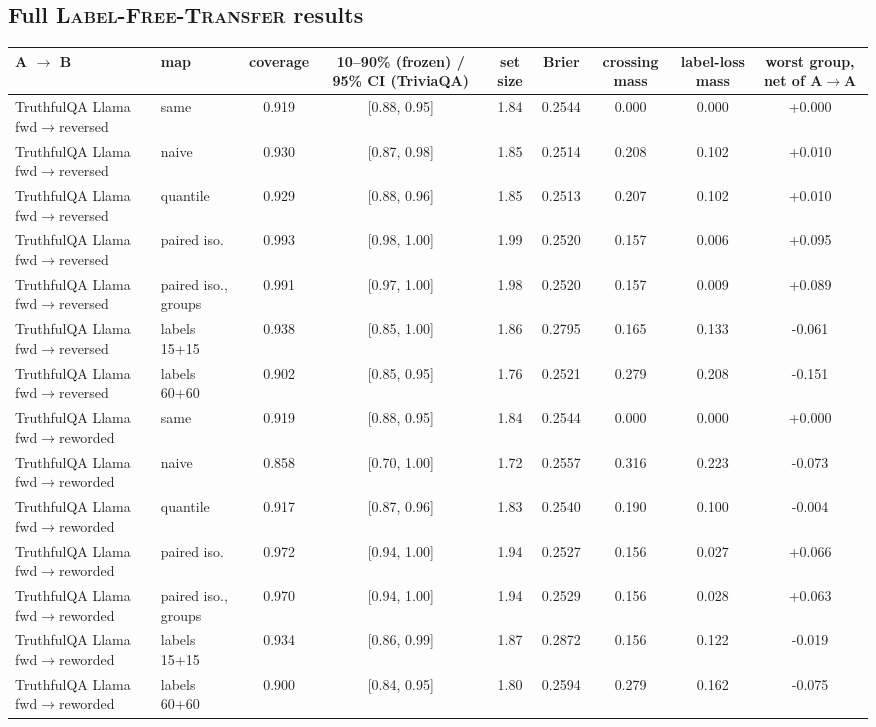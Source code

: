 \documentclass[11pt]{article}
\theoremstyle{definition}
\theoremstyle{remark}
\newcommand{\1}{\mathbf{1}}
\newcommand{\expname}[1]{\textsc{#1}}
\begin{document}
\subsection{Full \expname{Label-Free-Transfer} results}
\label{app:e8}
\begin{center}\small
\begin{tabular}{llccccccc}
\toprule
A $\to$ B & map & coverage & 10--90\% (frozen) / 95\% CI (TriviaQA) & set size & Brier & crossing mass & label-loss mass & worst group, net of A$\to$A\\
\midrule
TruthfulQA Llama fwd$\to$reversed & same & 0.919 & [0.88, 0.95] & 1.84 & 0.2544 & 0.000 & 0.000 & +0.000\\
TruthfulQA Llama fwd$\to$reversed & naive & 0.930 & [0.87, 0.98] & 1.85 & 0.2514 & 0.208 & 0.102 & +0.010\\
TruthfulQA Llama fwd$\to$reversed & quantile & 0.929 & [0.88, 0.96] & 1.85 & 0.2513 & 0.207 & 0.102 & +0.010\\
TruthfulQA Llama fwd$\to$reversed & paired iso. & 0.993 & [0.98, 1.00] & 1.99 & 0.2520 & 0.157 & 0.006 & +0.095\\
TruthfulQA Llama fwd$\to$reversed & paired iso., groups & 0.991 & [0.97, 1.00] & 1.98 & 0.2520 & 0.157 & 0.009 & +0.089\\
TruthfulQA Llama fwd$\to$reversed & labels 15+15 & 0.938 & [0.85, 1.00] & 1.86 & 0.2795 & 0.165 & 0.133 & -0.061\\
TruthfulQA Llama fwd$\to$reversed & labels 60+60 & 0.902 & [0.85, 0.95] & 1.76 & 0.2521 & 0.279 & 0.208 & -0.151\\
\midrule
TruthfulQA Llama fwd$\to$reworded & same & 0.919 & [0.88, 0.95] & 1.84 & 0.2544 & 0.000 & 0.000 & +0.000\\
TruthfulQA Llama fwd$\to$reworded & naive & 0.858 & [0.70, 1.00] & 1.72 & 0.2557 & 0.316 & 0.223 & -0.073\\
TruthfulQA Llama fwd$\to$reworded & quantile & 0.917 & [0.87, 0.96] & 1.83 & 0.2540 & 0.190 & 0.100 & -0.004\\
TruthfulQA Llama fwd$\to$reworded & paired iso. & 0.972 & [0.94, 1.00] & 1.94 & 0.2527 & 0.156 & 0.027 & +0.066\\
TruthfulQA Llama fwd$\to$reworded & paired iso., groups & 0.970 & [0.94, 1.00] & 1.94 & 0.2529 & 0.156 & 0.028 & +0.063\\
TruthfulQA Llama fwd$\to$reworded & labels 15+15 & 0.934 & [0.86, 0.99] & 1.87 & 0.2872 & 0.156 & 0.122 & -0.019\\
TruthfulQA Llama fwd$\to$reworded & labels 60+60 & 0.900 & [0.84, 0.95] & 1.80 & 0.2594 & 0.279 & 0.162 & -0.075\\

\end{tabular}
\end{center}
\end{document}
